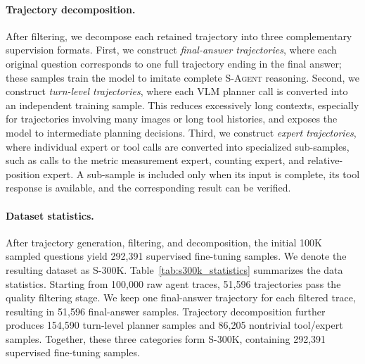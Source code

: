 \documentclass{llmxive}
\begin{document}
\paragraph{Trajectory decomposition.}
After filtering, we decompose each retained trajectory into three complementary supervision formats. 
First, we construct \emph{final-answer trajectories}, where each original question corresponds to one full trajectory ending in the final answer; these samples train the model to imitate complete \textsc{S-Agent} reasoning. 
Second, we construct \emph{turn-level trajectories}, where each VLM planner call is converted into an independent training sample. 
This reduces excessively long contexts, especially for trajectories involving many images or long tool histories, and exposes the model to intermediate planning decisions. 
Third, we construct \emph{expert trajectories}, where individual expert or tool calls are converted into specialized sub-samples, such as calls to the metric measurement expert, counting expert, and relative-position expert. 
A sub-sample is included only when its input is complete, its tool response is available, and the corresponding result can be verified.

\paragraph{Dataset statistics.}
After trajectory generation, filtering, and decomposition, the initial 100K sampled questions yield 292,391 supervised fine-tuning samples. 
We denote the resulting dataset as \textsc{S-300K}. 
Table~\ref{tab:s300k_statistics} summarizes the data statistics. 
Starting from 100,000 raw agent traces, 51,596 trajectories pass the quality filtering stage. 
We keep one final-answer trajectory for each filtered trace, resulting in 51,596 final-answer samples. 
Trajectory decomposition further produces 154,590 turn-level planner samples and 86,205 nontrivial tool/expert samples. 
Together, these three categories form \textsc{S-300K}, containing 292,391 supervised fine-tuning samples. 
\end{document}
